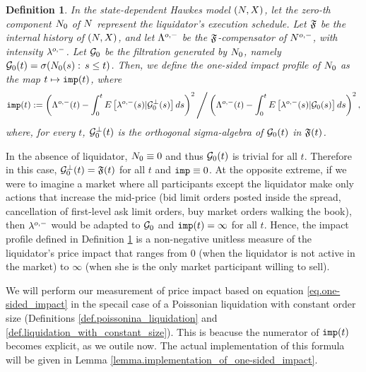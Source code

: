 \documentclass[10pt]{article}
\newtheorem{defi}[thm]{Definition}
\begin{document}
\begin{defi}\label{def.one-sided_impact}
 In the state-dependent Hawkes model $\sdHawkesPair$, let the zero-th component $\countingProc[0]$ of $\multiCountingProc$ represent the liquidator's execution schedule. Let $\internalHistory$ be the internal history of $\sdHawkesPair$, and let $\weakDeflCompensator$ be the $\internalHistory$-compensator of $\weakDeflPP$, with intensity $\weakDeflIntensity$. Let $\liquidatorSigmaAlgebra$ be the filtration generated by $\countingProc[0]$, namely $\liquidatorSigmaAlgebra(t) = \sigma(\countingProc[0](s): \, s\leq t)$. Then, we define the one-sided impact profile of  $\countingProc[0]$ as the map $t\mapsto \impactProfile(t)$, where
 \begin{equation}\label{eq.one-sided_impact}
  \impactProfile(t):=
  \left(\weakDeflCompensator(t) 
    - \intzerot\Expectation\left[\weakDeflIntensity(s)\vert \liquidatorSigmaAlgebra\orthogonal(s)\right]ds \right)\squared
    \Bigg/
      \left(\weakDeflCompensator(t) 
    - \intzerot\Expectation\left[\weakDeflIntensity(s)\vert \liquidatorSigmaAlgebra(s)\right]ds \right)\squared, 
 \end{equation}
 where, for every $t$,  $\liquidatorSigmaAlgebra\orthogonal(t)$ is the orthogonal sigma-algebra of $\liquidatorSigmaAlgebra(t)$ in $\internalHistory(t)$.
\end{defi}

In the absence of liquidator, $\countingProc[0] \equiv 0$ and thus $\sigmaAlgebraG_0(t)$ is trivial for all $t$. Therefore in this case, $\sigmaAlgebraG_{0}\orthogonal(t) = \internalHistory(t)$ for all $t$ and $\impactProfile \equiv 0$. 
At the opposite extreme, if we were to imagine a market where all participants except the liquidator make only actions that increase the mid-price (bid limit orders posted inside the spread, cancellation of first-level ask limit orders, buy market orders walking the book), then $\weakDeflIntensity$ would be adapted to $\sigmaAlgebraG_0$ and $\impactProfile(t)=\infty$ for all $t$. Hence, the impact profile defined in Definition \ref{def.one-sided_impact} is a non-negative unitless measure of the liquidator's price impact that ranges from $0$ (when the liquidator is not active in the market) to $\infty$ (when she is the only market participant willing to sell). 

We will perform our measurement of price impact based on equation \eqref{eq.one-sided_impact} in the specail case of a Poissonian liquidation with constant order size (Definitions \ref{def.poissonina_liquidation} and \ref{def.liquidation_with_constant_size}). This is beacuse the numerator of $\impactProfile(t)$ becomes explicit, as we outile now. The actual implementation of this formula will be given in Lemma \ref{lemma.implementation_of_one-sided_impact}.
\end{document}
